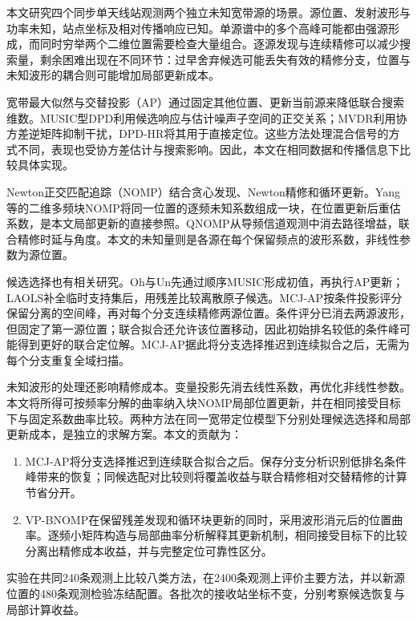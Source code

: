 \documentclass[a4paper,fleqn]{cas-sc}
\begin{document}
本文研究四个同步单天线站观测两个独立未知宽带源的场景。源位置、发射波形与功率未知，站点坐标及相对传播响应已知。单源谱中的多个高峰可能都由强源形成，而同时穷举两个二维位置需要检查大量组合。逐源发现与连续精修可以减少搜索量，剩余困难出现在不同环节：过早舍弃候选可能丢失有效的精修分支，位置与未知波形的耦合则可能增加局部更新成本。

宽带最大似然与交替投影（AP）通过固定其他位置、更新当前源来降低联合搜索维数\cite{ChenHudsonYao2002}。MUSIC型DPD利用候选响应与估计噪声子空间的正交关系\cite{WeissAmar2005}；MVDR利用协方差逆矩阵抑制干扰\cite{Capon1969}，DPD-HR将其用于直接定位\cite{TirerWeiss2016}。这些方法处理混合信号的方式不同，表现也受协方差估计与搜索影响。因此，本文在相同数据和传播信息下比较具体实现。

Newton正交匹配追踪（NOMP）结合贪心发现、Newton精修和循环更新\cite{Mamandipoor2016}。Yang等的二维多频块NOMP将同一位置的逐频未知系数组成一块，在位置更新后重估系数\cite{Yang2022}，是本文局部更新的直接参照。QNOMP从导频信道观测中消去路径增益，联合精修时延与角度\cite{Zeng2025}。本文的未知量则是各源在每个保留频点的波形系数，非线性参数为源位置。

候选选择也有相关研究。Oh与Un先通过顺序MUSIC形成初值，再执行AP更新\cite{OhUn1991}；LAOLS补全临时支持集后，用残差比较离散原子候选\cite{Chatterjee2012}。MCJ-AP按条件投影评分保留分离的空间峰，再对每个分支连续精修两源位置。条件评分已消去两源波形，但固定了第一源位置；联合拟合还允许该位置移动，因此初始排名较低的条件峰可能得到更好的联合定位解。MCJ-AP据此将分支选择推迟到连续拟合之后，无需为每个分支重复全域扫描。

未知波形的处理还影响精修成本。变量投影先消去线性系数，再优化非线性参数\cite{GolubPereyra1973}。本文将所得可按频率分解的曲率纳入块NOMP局部位置更新，并在相同接受目标下与固定系数曲率比较。两种方法在同一宽带定位模型下分别处理候选选择和局部更新成本，是独立的求解方案。本文的贡献为：
\begin{enumerate}
\item MCJ-AP将分支选择推迟到连续联合拟合之后。保存分支分析识别低排名条件峰带来的恢复；同候选配对比较则将覆盖收益与联合精修相对交替精修的计算节省分开。
\item VP-BNOMP在保留残差发现和循环块更新的同时，采用波形消元后的位置曲率。逐频小矩阵构造与局部曲率分析解释其更新机制，相同接受目标下的比较分离出精修成本收益，并与完整定位可靠性区分。
\end{enumerate}
实验在共同240条观测上比较八类方法，在2400条观测上评价主要方法，并以新源位置的480条观测检验冻结配置。各批次的接收站坐标不变，分别考察候选恢复与局部计算收益。
\end{document}
